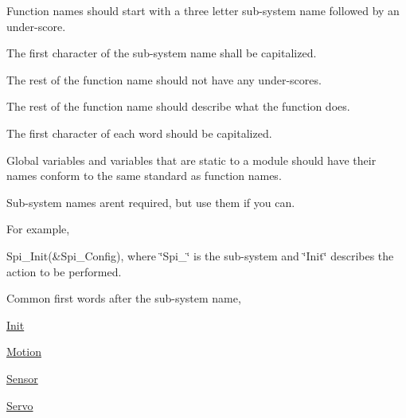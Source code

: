 \begin{DoxyItemize}
\item Function names should start with a three letter sub-\/system name followed by an under-\/score. ~\newline

\item The first character of the sub-\/system name shall be capitalized. ~\newline

\item The rest of the function name should not have any under-\/scores. ~\newline

\item The rest of the function name should describe what the function does.~\newline

\item The first character of each word should be capitalized. ~\newline

\item Global variables and variables that are static to a module should have their names conform to the same standard as function names. ~\newline

\item Sub-\/system names aren\textquotesingle{}t required, but use them if you can.~\newline
~\newline

\end{DoxyItemize}

For example,
\begin{DoxyItemize}
\item Spi\+\_\+\+Init(\&\+Spi\+\_\+\+Config), where \char`\"{}\+Spi\+\_\+\char`\"{} is the sub-\/system and \char`\"{}\+Init\char`\"{} describes the action to be performed.~\newline
~\newline

\end{DoxyItemize}

Common first words after the sub-\/system name,
\begin{DoxyItemize}
\item \mbox{\hyperlink{class_init}{Init}}
\item \mbox{\hyperlink{class_motion}{Motion}}
\item \mbox{\hyperlink{class_sensor}{Sensor}}
\item \mbox{\hyperlink{class_servo}{Servo}}
\end{DoxyItemize}

